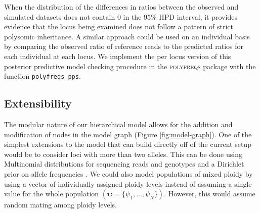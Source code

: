 \documentclass[11pt,english,letterpaper,oneside]{article}
\begin{document}
When the distribution of the differences in ratios between the observed and simulated datasets does not contain 0 in the 95\% HPD interval, it provides evidence that the locus being examined does not follow a pattern of strict polysomic inheritance. A similar approach could be used on an individual basis by comparing the observed ratio of reference reads to the predicted ratios for each individual at each locus. We implement the per locus version of this posterior predictive model checking procedure in the \textsc{polyfreqs} package with the function \texttt{polyfreqs\_pps}.

\medskip
\subsection*{Extensibility}
\medskip

The modular nature of our hierarchical model allows for the addition and modification of nodes in the model graph (Figure \ref{fig:model-graph}). One of the simplest extensions to the model that can build directly off of the current setup would be to consider loci with more than two alleles. This can be done using Multinomial distributions for sequencing reads and genotypes and a Dirichlet prior on allele frequencies \citep[the Multinomial and Dirichlet distributions form a conjugate family;][]{gelman2014bayesian}. We could also model populations of mixed ploidy by using a vector of individually assigned ploidy levels instead of assuming a single value for the whole population $(\bm{\psi} = \{\psi_1,\ldots,\psi_N\})$. However, this would assume random mating among ploidy levels.
\medskip
\end{document}
